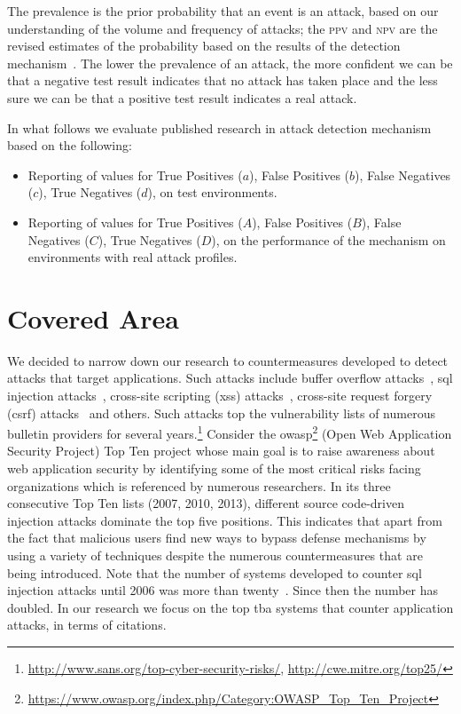 \documentclass[conference]{IEEEtran}
\begin{document}
The prevalence is the prior probability that an event is an attack,
based on our understanding of the volume and frequency of attacks; the
\textsc{ppv} and \textsc{npv} are the revised estimates of the
probability based on the results of the detection
mechanism~\cite{altman1994}. The lower the prevalence of an attack,
the more confident we can be that a negative test result indicates
that no attack has taken place and the less sure we can be that a
positive test result indicates a real attack. 

In what follows we evaluate published research in attack detection
mechanism based on the following:
\begin{itemize}
\item Reporting of values for True Positives ($a$), False Positives
  ($b$), False Negatives ($c$), True Negatives ($d$), on test
  environments.
\item Reporting of values for True Positives ($A$), False Positives
  ($B$), False Negatives ($C$), True Negatives ($D$), on the
  performance of the mechanism on environments with real attack
  profiles.
\end{itemize}

\section{Covered Area}

We decided to narrow down our
research to countermeasures developed to
detect attacks that target applications. Such attacks include
buffer overflow attacks~\cite{K11}, {\sc sql} injection
attacks~\cite{RL12b}, cross-site scripting ({\sc xss})
attacks~\cite{SG07}, cross-site request forgery ({\sc csrf})
attacks~\cite{LZRL09} and others.
Such attacks top the vulnerability lists of numerous bulletin providers for several
years.\footnote{\url{http://www.sans.org/top-cyber-security-risks/}, \url{http://cwe.mitre.org/top25/}}
Consider the {\sc owasp}\footnote{\url{https://www.owasp.org/index.php/Category:OWASP_Top_Ten_Project}}
(Open Web Application Security Project)
Top Ten project whose main goal is to raise awareness about
web application security by identifying some of the most critical risks facing
organizations which is referenced by numerous researchers.
In its three consecutive Top Ten lists (2007, 2010, 2013), different
source code-driven injection attacks dominate the top five positions.
This indicates that
apart from the fact that malicious users find new ways to bypass
defense mechanisms by using a variety of techniques despite the numerous
countermeasures that are being introduced.
Note that the number of systems developed to counter {\sc sql}
injection attacks until 2006 was more than twenty~\cite{HVO06}.
Since then the number has doubled.
In our research we focus on the top {\sc tba} systems that counter
application attacks, in terms of citations.
\end{document}

